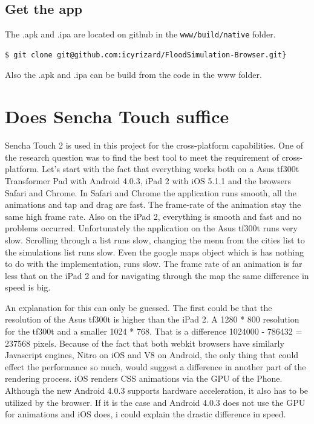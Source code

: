 \subsection{Get the app}
The .apk and .ipa are located on github in the \texttt{www/build/native} folder. \\
\begin{lstlisting}
$ git clone git@github.com:icyrizard/FloodSimulation-Browser.git}
\end{lstlisting}
Also the .apk and .ipa can be build from the code in the www folder. \\


\section{Does Sencha Touch suffice}
\label{sec:suffice}
Sencha Touch 2 is used in this project for the cross-platform capabilities. One of the research question was to find the best tool to meet the requirement of cross-platform. Let's start with the fact that everything works both on a Asus tf300t Transformer Pad with Android 4.0.3, iPad 2 with iOS 5.1.1 and the browsers Safari and Chrome. In Safari and Chrome the application runs smooth, all the animations and tap and drag are fast. The frame-rate of the animation stay the same high frame rate. Also on the iPad 2, everything is smooth and fast and no problems occurred. Unfortunately the application on the Asus tf300t runs very slow. Scrolling through a list runs slow, changing the menu from the cities list to the simulations list runs slow. Even the google maps object which is has nothing to do with the implementation, runs slow. The frame rate of an animation is far less that on the iPad 2 and for navigating through the map the same difference in speed is big. 

An explanation for this can only be guessed. The first could be that the resolution of the Asus tf300t is higher than the iPad 2. A 1280 * 800 resolution for the tf300t and a smaller 1024 * 768. That is a difference 1024000 - 786432 = 237568 pixels. 
Because of the fact that both webkit browsers have similarly Javascript engines, Nitro on iOS and V8 on Android, the only thing that could effect the performance so much, would suggest a difference in another part of the rendering process. iOS renders CSS animations via the GPU of the Phone. Although the new Android 4.0.3 supports hardware acceleration, it also has to be utilized by the browser. If it is the case and Android 4.0.3 does not use the GPU for animations and iOS does, i could explain the drastic difference in speed. 

